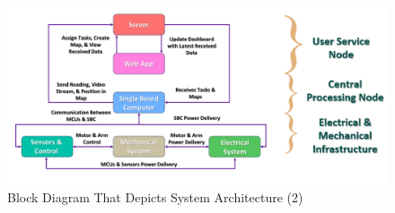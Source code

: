 \begin{figure}[h!]
	\centering
	\includegraphics[scale=0.3]{./Figures/Intro/Capture2.PNG}
	\caption{Block Diagram That Depicts System Architecture (2)}
	\label{fig:sysarch}
\end{figure} 


